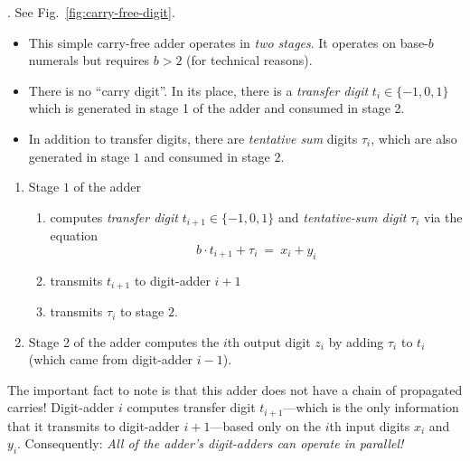 . 
See Fig.~\ref{fig:carry-free-digit}.
\begin{itemize}
\item
This simple carry-free adder operates in {\em two stages}.  It operates on base-$b$ numerals but requires $b > 2$ (for technical reasons).
\item
There is no ``carry digit''.  In its place, there is a {\it transfer digit} $t_i \in \{-1, 0, 1\}$ which is generated in stage 1 of the adder and consumed in stage 2.
\item
In addition to transfer digits, there are {\it tentative sum} digits $\tau_i$, which are also generated in stage $1$ and consumed in stage $2$.
\end{itemize}
\begin{enumerate}
\item
Stage $1$ of the adder
\begin{enumerate}
\item
computes {\it transfer digit} $t_{i+1} \in \{-1, 0 , 1\}$ and {\it tentative-sum digit} $\tau_i$ via the equation
\[ b \cdot t_{i+1} + \tau_i \ = \ x_i + y_i \]
\item
transmits $t_{i+1}$ to digit-adder $i+1$
\item
transmits $\tau_i$ to stage $2$.
\end{enumerate}
\item
Stage 2 of the adder computes the $i$th output digit $z_i$ by adding $\tau_i$ to $t_i$ (which came from digit-adder $i-1$).
\end{enumerate}
The important fact to note is that this adder does not have a chain of propagated carries!  Digit-adder $i$ computes transfer digit $t_{i+1}$---which is the only information that it transmits to
digit-adder $i+1$---based only on the $i$th input digits $x_i$ and $y_i$.  Consequently: {\em All of the adder's digit-adders can operate in parallel!}
